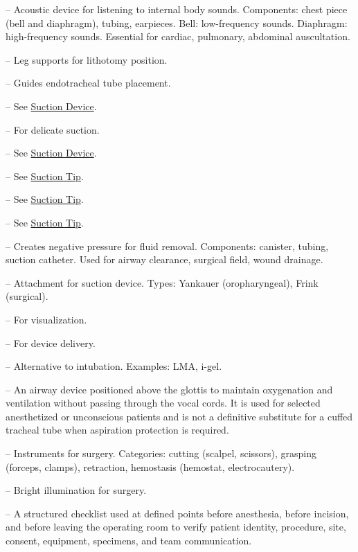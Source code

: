 -- Acoustic device for listening to internal body sounds. Components: chest piece (bell and diaphragm), tubing, earpieces. Bell: low-frequency sounds. Diaphragm: high-frequency sounds. Essential for cardiac, pulmonary, abdominal auscultation.

-- Leg supports for lithotomy position.


-- Guides endotracheal tube placement.

-- See \hyperlink{Suction Device}{Suction Device}.

-- For delicate suction.

-- See \hyperlink{Suction Device}{Suction Device}.

-- See \hyperlink{Suction Tip}{Suction Tip}.

-- See \hyperlink{Suction Tip}{Suction Tip}.


-- See \hyperlink{Suction Tip}{Suction Tip}.

-- Creates negative pressure for fluid removal. Components: canister, tubing, suction catheter. Used for airway clearance, surgical field, wound drainage.

-- Attachment for suction device. Types: Yankauer (oropharyngeal), Frink (surgical).

-- For visualization.

-- For device delivery.

-- Alternative to intubation. Examples: LMA, i-gel.

-- An airway device positioned above the glottis to maintain oxygenation and ventilation without passing through the vocal cords. It is used for selected anesthetized or unconscious patients and is not a definitive substitute for a cuffed tracheal tube when aspiration protection is required.

-- Instruments for surgery. Categories: cutting (scalpel, scissors), grasping (forceps, clamps), retraction, hemostasis (hemostat, electrocautery).

-- Bright illumination for surgery.

-- A structured checklist used at defined points before anesthesia, before incision, and before leaving the operating room to verify patient identity, procedure, site, consent, equipment, specimens, and team communication.

